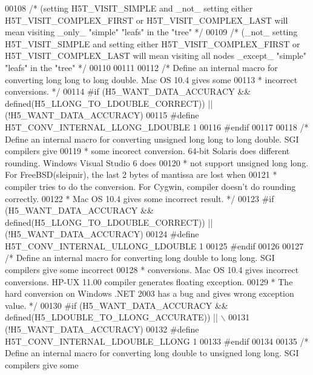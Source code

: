 \begin{DoxyCode}
00108                                                 \textcolor{comment}{/* (setting H5T\_VISIT\_SIMPLE and \_not\_ setting either
       H5T\_VISIT\_COMPLEX\_FIRST or H5T\_VISIT\_COMPLEX\_LAST will mean visiting \_only\_ "simple" "leafs" in the "tree" */}
00109                                                 \textcolor{comment}{/* (\_not\_ setting H5T\_VISIT\_SIMPLE and setting either
       H5T\_VISIT\_COMPLEX\_FIRST or H5T\_VISIT\_COMPLEX\_LAST will mean visiting all nodes \_except\_ "simple" "leafs" in the
       "tree" */}
00110 
00111 
00112 \textcolor{comment}{/* Define an internal macro for converting long long to long double.  Mac OS 10.4 gives some}
00113 \textcolor{comment}{ * incorrect conversions. */}
00114 \textcolor{preprocessor}{#if (H5\_WANT\_DATA\_ACCURACY && defined(H5\_LLONG\_TO\_LDOUBLE\_CORRECT)) || (!H5\_WANT\_DATA\_ACCURACY)}
00115 \textcolor{preprocessor}{#define H5T\_CONV\_INTERNAL\_LLONG\_LDOUBLE       1}
00116 \textcolor{preprocessor}{#endif}
00117 
00118 \textcolor{comment}{/* Define an internal macro for converting unsigned long long to long double.  SGI compilers give}
00119 \textcolor{comment}{ * some incorect conversion.  64-bit Solaris does different rounding.   Windows Visual Studio 6 does}
00120 \textcolor{comment}{ * not support unsigned long long.  For FreeBSD(sleipnir), the last 2 bytes of mantissa are lost when}
00121 \textcolor{comment}{ * compiler tries to do the conversion.  For Cygwin, compiler doesn't do rounding correctly.}
00122 \textcolor{comment}{ * Mac OS 10.4 gives some incorrect result. */}
00123 \textcolor{preprocessor}{#if (H5\_WANT\_DATA\_ACCURACY && defined(H5\_LLONG\_TO\_LDOUBLE\_CORRECT)) || (!H5\_WANT\_DATA\_ACCURACY)}
00124 \textcolor{preprocessor}{#define H5T\_CONV\_INTERNAL\_ULLONG\_LDOUBLE         1}
00125 \textcolor{preprocessor}{#endif}
00126 
00127 \textcolor{comment}{/* Define an internal macro for converting long double to long long.  SGI compilers give some incorrect}
00128 \textcolor{comment}{ * conversions. Mac OS 10.4 gives incorrect conversions. HP-UX 11.00 compiler generates floating exception.}
00129 \textcolor{comment}{ * The hard conversion on Windows .NET 2003 has a bug and gives wrong exception value. */}
00130 \textcolor{preprocessor}{#if (H5\_WANT\_DATA\_ACCURACY && defined(H5\_LDOUBLE\_TO\_LLONG\_ACCURATE)) || \(\backslash\)}
00131 \textcolor{preprocessor}{    (!H5\_WANT\_DATA\_ACCURACY)}
00132 \textcolor{preprocessor}{#define H5T\_CONV\_INTERNAL\_LDOUBLE\_LLONG         1}
00133 \textcolor{preprocessor}{#endif}
00134 
00135 \textcolor{comment}{/* Define an internal macro for converting long double to unsigned long long.  SGI compilers give some}

\end{DoxyCode}

